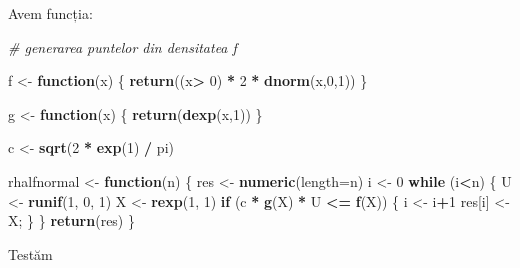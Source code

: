 \documentclass[]{article}
\newenvironment{Shaded}{\begin{snugshade}}{\end{snugshade}}
\newcommand{\KeywordTok}[1]{\textcolor[rgb]{0.13,0.29,0.53}{\textbf{#1}}}
\newcommand{\DataTypeTok}[1]{\textcolor[rgb]{0.13,0.29,0.53}{#1}}
\newcommand{\DecValTok}[1]{\textcolor[rgb]{0.00,0.00,0.81}{#1}}
\newcommand{\StringTok}[1]{\textcolor[rgb]{0.31,0.60,0.02}{#1}}
\newcommand{\CommentTok}[1]{\textcolor[rgb]{0.56,0.35,0.01}{\textit{#1}}}
\newcommand{\ControlFlowTok}[1]{\textcolor[rgb]{0.13,0.29,0.53}{\textbf{#1}}}
\newcommand{\OperatorTok}[1]{\textcolor[rgb]{0.81,0.36,0.00}{\textbf{#1}}}
\newcommand{\NormalTok}[1]{#1}
\begin{document}
Avem funcția:

\begin{Shaded}
\begin{Highlighting}[]
\CommentTok{# generarea puntelor din densitatea f}

\NormalTok{f <-}\StringTok{ }\ControlFlowTok{function}\NormalTok{(x) \{}
  \KeywordTok{return}\NormalTok{((x}\OperatorTok{>}\StringTok{ }\DecValTok{0}\NormalTok{) }\OperatorTok{*}\StringTok{ }\DecValTok{2} \OperatorTok{*}\StringTok{ }\KeywordTok{dnorm}\NormalTok{(x,}\DecValTok{0}\NormalTok{,}\DecValTok{1}\NormalTok{))}
\NormalTok{\}}

\NormalTok{g <-}\StringTok{ }\ControlFlowTok{function}\NormalTok{(x) \{ }\KeywordTok{return}\NormalTok{(}\KeywordTok{dexp}\NormalTok{(x,}\DecValTok{1}\NormalTok{)) \}}

\NormalTok{c <-}\StringTok{ }\KeywordTok{sqrt}\NormalTok{(}\DecValTok{2} \OperatorTok{*}\StringTok{ }\KeywordTok{exp}\NormalTok{(}\DecValTok{1}\NormalTok{) }\OperatorTok{/}\StringTok{ }\NormalTok{pi)}

\NormalTok{rhalfnormal <-}\StringTok{ }\ControlFlowTok{function}\NormalTok{(n) \{}
\NormalTok{  res <-}\StringTok{ }\KeywordTok{numeric}\NormalTok{(}\DataTypeTok{length=}\NormalTok{n)}
\NormalTok{  i <-}\StringTok{ }\DecValTok{0}
  \ControlFlowTok{while}\NormalTok{ (i}\OperatorTok{<}\NormalTok{n) \{}
\NormalTok{    U <-}\StringTok{ }\KeywordTok{runif}\NormalTok{(}\DecValTok{1}\NormalTok{, }\DecValTok{0}\NormalTok{, }\DecValTok{1}\NormalTok{)}
\NormalTok{    X <-}\StringTok{ }\KeywordTok{rexp}\NormalTok{(}\DecValTok{1}\NormalTok{, }\DecValTok{1}\NormalTok{)}
    \ControlFlowTok{if}\NormalTok{ (c }\OperatorTok{*}\StringTok{ }\KeywordTok{g}\NormalTok{(X) }\OperatorTok{*}\StringTok{ }\NormalTok{U }\OperatorTok{<=}\StringTok{ }\KeywordTok{f}\NormalTok{(X)) \{}
\NormalTok{      i <-}\StringTok{ }\NormalTok{i}\OperatorTok{+}\DecValTok{1}
\NormalTok{      res[i] <-}\StringTok{ }\NormalTok{X;}
\NormalTok{    \}}
\NormalTok{  \}}
  \KeywordTok{return}\NormalTok{(res)}
\NormalTok{\}}
\end{Highlighting}
\end{Shaded}

Testăm
\end{document}
